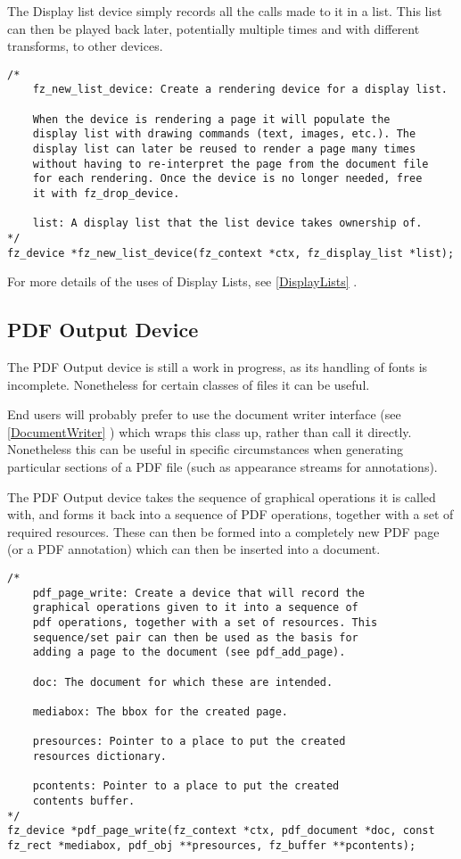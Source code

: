 \documentclass[oneside]{book}
\newcommand{\rjwref}[1] {\autoref{#1} \nameref{#1}}
\begin{document}
The Display list device simply records all the calls made to it in a list. This list can then be played back later, potentially multiple times and with different transforms, to other devices.

\begin{lstlisting}
/*
	fz_new_list_device: Create a rendering device for a display list.

	When the device is rendering a page it will populate the
	display list with drawing commands (text, images, etc.). The
	display list can later be reused to render a page many times
	without having to re-interpret the page from the document file
	for each rendering. Once the device is no longer needed, free
	it with fz_drop_device.

	list: A display list that the list device takes ownership of.
*/
fz_device *fz_new_list_device(fz_context *ctx, fz_display_list *list);
\end{lstlisting}

For more details of the uses of Display Lists, see \rjwref{DisplayLists}.

\subsection{PDF Output Device}
\label{PDFDevice}

The PDF Output device is still a work in progress, as its handling of fonts is incomplete. Nonetheless for certain classes of files it can be useful.

End users will probably prefer to use the document writer interface (see \rjwref{DocumentWriter}) which wraps this class up, rather than call it directly. Nonetheless this can be useful in specific circumstances when generating particular sections of a PDF file (such as appearance streams for annotations).

The PDF Output device takes the sequence of graphical operations it is called with, and forms it back into a sequence of PDF operations, together with a set of required resources. These can then be formed into a completely new PDF page (or a PDF annotation) which can then be inserted into a document.

\begin{lstlisting}
/*
	pdf_page_write: Create a device that will record the
	graphical operations given to it into a sequence of
	pdf operations, together with a set of resources. This
	sequence/set pair can then be used as the basis for
	adding a page to the document (see pdf_add_page).
	
	doc: The document for which these are intended.

	mediabox: The bbox for the created page.

	presources: Pointer to a place to put the created
	resources dictionary.

	pcontents: Pointer to a place to put the created
	contents buffer.
*/
fz_device *pdf_page_write(fz_context *ctx, pdf_document *doc, const fz_rect *mediabox, pdf_obj **presources, fz_buffer **pcontents);
\end{lstlisting}
\end{document}
